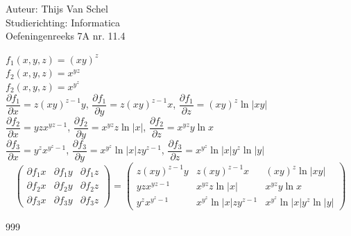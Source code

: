 \documentclass[a4paper]{article}
\newcommand{\pdv}{\partial}
\begin{document}
  
\noindent \large Auteur: Thijs Van Schel \\
\noindent \large Studierichting: Informatica\\
\noindent \large Oefeningenreeks 7A nr. 11.4\\

\medskip

$f_1(x,y,z) = (xy)^z$\\

$f_2(x,y,z) = x^{yz}$\\

$f_2(x,y,z) = x^{y^{z}}$\\

$\dfrac{\pdv f_1 }{\pdv x} = z(xy)^{z-1}y$, $\dfrac{\pdv f_1 }{\pdv y} =  z(xy)^{z-1}x$, $\dfrac{\pdv f_1 }{\pdv z} = (xy)^z \ln|xy|$\\

$\dfrac{\pdv f_2 }{\pdv x} = yzx^{yz-1}$, $\dfrac{\pdv f_2 }{\pdv y} = x^{yz}z\ln|x|$, $\dfrac{\pdv f_2 }{\pdv z} = x^{yz}y\ln x$\\

$\dfrac{\pdv f_3 }{\pdv x} = y^z x^{y^{z}-1}$, $\dfrac{\pdv f_3 }{\pdv y} = x^{y^{z}}\ln |x|zy^{z-1}$, $\dfrac{\pdv f_3 }{\pdv z} = x^{y^{z}} \ln|x| y^z \ln|y|$\\

\[
\left(
\begin{array}{ccc}
\pdv{f_1}{x} & \pdv{f_1}{y} & \pdv{f_1}{z} \\
\pdv{f_2}{x} & \pdv{f_2}{y} & \pdv{f_2}{z} \\
\pdv{f_3}{x} & \pdv{f_3}{y} & \pdv{f_3}{z}
\end{array}
\right)
=
\left(
\begin{array}{ccc}
z(xy)^{z-1}y & z(xy)^{z-1}x & (xy)^z \ln|xy| \\
yzx^{yz-1} & x^{yz}z\ln|x| & x^{yz}y\ln x \\
y^z x^{y^{z}-1} & x^{y^{z}}\ln |x|zy^{z-1} & x^{y^{z}} \ln|x| y^z \ln|y|
\end{array}
\right)
\]







\normalsize



\begin{thebibliography}{999}
\end{thebibliography}
\end{document}
